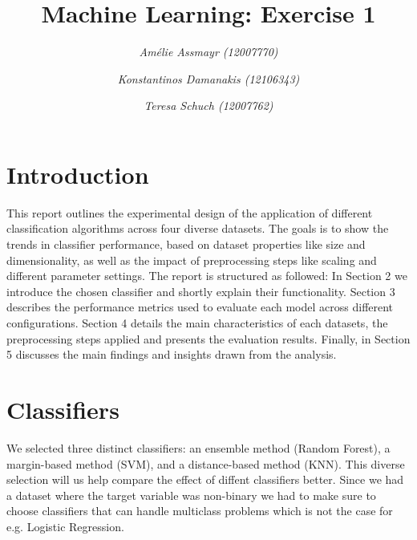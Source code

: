 \documentclass{article}
\title{\textbf{Machine Learning: Exercise 1}}
\author{\textit{Amélie Assmayr (12007770)} \and
        \textit{Konstantinos Damanakis (12106343)} \and
        \textit{Teresa Schuch (12007762)}}
\date{}
\begin{document}
\maketitle
\vspace{-20pt}



\section{Introduction}
This report outlines the experimental design of the application of different classification algorithms across four diverse datasets. The goals is to show the trends in classifier performance, based on dataset properties like size and dimensionality, as well as the impact of preprocessing steps like scaling and different parameter settings.
The report is structured as followed: In Section 2 we introduce the chosen classifier and shortly explain their functionality. Section 3 describes the performance metrics used to evaluate each model across different configurations. Section 4 details the main characteristics of each datasets, the preprocessing steps applied and presents the evaluation results. Finally, in Section 5 discusses the main findings and insights drawn from the analysis.



\section{Classifiers}
We selected three distinct classifiers: an ensemble method (Random Forest), a margin-based method (SVM), and a distance-based method (KNN). This diverse selection will us help compare the effect of diffent classifiers better. Since we had a dataset where the target variable was non-binary we had to make sure to choose classifiers that can handle multiclass problems which is not the case for e.g. Logistic Regression.
\end{document}
